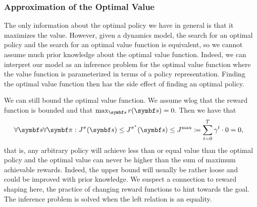 \subsubsection{Approximation of the Optimal Value}
The only information about the optimal policy we have in general is that it maximizes the value.
However, given a dynamics model, the search for an optimal policy and the search for an optimal value function is equivalent, so we cannot assume much prior knowledge about the optimal value function.
Indeed, we can interpret our model as an inference problem for the optimal value function where the value function is parameterized in terms of a policy representation.
Finding the optimal value function then has the side effect of finding an optimal policy.

We can still bound the optimal value function.
We assume wlog that the reward function is bounded and that $\max_{\mat{s}} r(\mat{s}) = 0$.
Then we have that
\begin{align}
    \label{eq:inequality_chain}
    \forall \mat{s} \forall \mat{\pi} : J^\pi(\mat{s}) \leq J^{\pi^\ast}(\mat{s}) \leq J^\text{max} \coloneqq \sum_{t=0}^T \gamma^t \cdot 0 = 0,
\end{align}
that is, any arbitrary policy will achieve less than or equal value than the optimal policy and the optimal value can never be higher than the sum of maximum achievable rewards.
Indeed, the upper bound will usually be rather loose and could be improved with prior knowledge.
We suspect a connection to reward shaping here, the practice of changing reward functions to hint towards the goal.
The inference problem is solved when the left relation is an equality.


